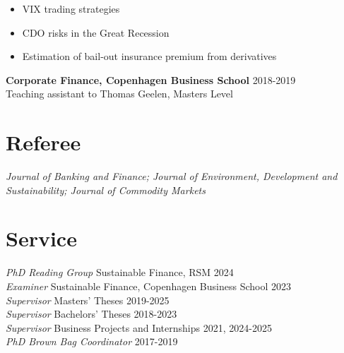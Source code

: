 \documentclass[11pt]{res} %
\newcommand{\fullhrulefill}{%
  \vspace{-1ex}%
  \hspace*{-\sectionwidth}\hrulefill%
  }
\begin{document}
\begin{resume}
\begin{itemize} \itemsep -2pt %
\item VIX trading strategies
\item CDO risks in the Great Recession
\item Estimation of bail-out insurance premium from derivatives
\end{itemize} 
\fi

{\bf Corporate Finance, Copenhagen Business School} \hfill 2018-2019  \\%
Teaching assistant to Thomas Geelen, Masters Level 


\vspace{0.2in} %

\section{Referee}
\fullhrulefill \newline
\textit{Journal of Banking and Finance; Journal of Environment, Development and Sustainability; Journal of Commodity Markets}



\vspace{0.2in} %

\section{Service}
\fullhrulefill \newline
\textit{PhD Reading Group} Sustainable Finance, RSM \hfill 2024\\
\textit{Examiner} Sustainable Finance, Copenhagen Business School \hfill 2023\\
\textit{Supervisor} Masters' Theses \hfill 2019-2025\\
\textit{Supervisor} Bachelors' Theses \hfill 2018-2023\\
\textit{Supervisor} Business Projects and Internships \hfill 2021, 2024-2025\\
\textit{PhD Brown Bag Coordinator} \hfill 2017-2019


\end{resume}
\end{document}
